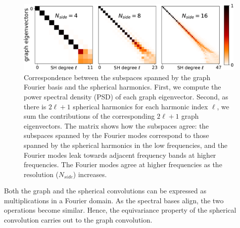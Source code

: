 \documentclass{article} %
\renewcommand{\b}[1]{{\bm{#1}}}   %
\newcommand{\1}{\b{1}}              %
\newcommand{\0}{\b{0}}              %
\begin{document}
\begin{figure}
	\centering
	\includegraphics[width=0.7\linewidth]{subspace_harmonics_eigenvectors_v2}
	\caption{Correspondence between the subspaces spanned by the graph Fourier basis and the spherical harmonics.
		First, we compute the power spectral density (PSD) of each graph eigenvector.
		Second, as there is $2\ell+1$ spherical harmonics for each harmonic index $\ell$, we sum the contributions of the corresponding $2\ell+1$ graph eigenvectors.
		The matrix shows how the subspaces agree: the subspaces spanned by the Fourier modes correspond to those spanned by the spherical harmonics in the low frequencies, and the Fourier modes leak towards adjacent frequency bands at higher frequencies.
		The Fourier modes agree at higher frequencies as the resolution ($N_{side}$) increases.}
		\label{fig:subspace_harmonics_eigenvectors}
\end{figure}

Both the graph and the spherical convolutions can be expressed as multiplications in a Fourier domain.
As the spectral bases align, the two operations become similar.
Hence, the equivariance property of the spherical convolution carries out to the graph convolution.
\end{document}
